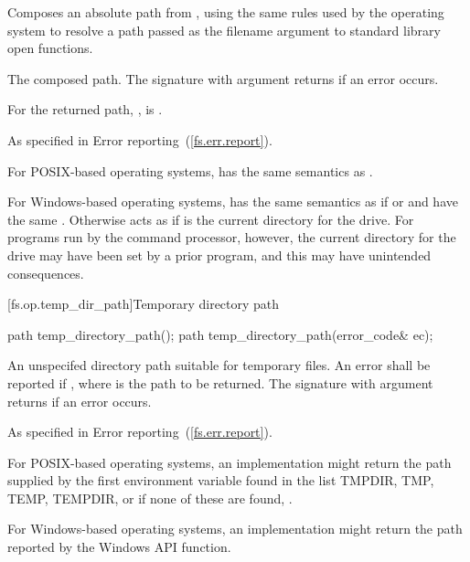 \begin{itemdescr}
\pnum
\effects Composes an absolute path from , using the
  same rules used by the operating system to resolve a path passed as the
  filename argument to standard library open functions.

\pnum
\returns The composed path. The signature with argument 
  returns  if an error occurs.

\pnum
\postconditions For the returned path, ,  is .

\pnum
\throws As specified in Error reporting~(\ref{fs.err.report}).

\pnum
\begin{example} For POSIX-based operating systems, 
  has the same semantics as .

\pnum
For Windows-based operating systems,  has the
  same semantics as  if
   or
   and  have the same .
  Otherwise  acts as if  is
  the current directory for the  drive.
  For programs run by the command processor, however, the current directory
  for the  drive may have been set by a prior program,
  and this may have unintended consequences.
\end{example}

\end{itemdescr}

[fs.op.temp_dir_path]{Temporary directory path}

%
\begin{itemdecl}
path temp_directory_path();
path temp_directory_path(error_code& ec);
\end{itemdecl}

\begin{itemdescr}
\pnum
\returns An unspecifed directory path suitable for temporary files. An error shall be reported if
, where  is the path to be returned.
  The signature with argument  returns  if an
  error occurs.

\pnum
\throws As specified in Error reporting~(\ref{fs.err.report}).

\pnum
\begin{example} For POSIX-based operating systems, an implementation might
  return the path
  supplied by the first environment variable found in the list TMPDIR, TMP, TEMP, TEMPDIR,
  or if none of these are found, .

\pnum
For Windows-based operating systems, an implementation might return the path
  reported by the Windows  API function.
\end{example}
\end{itemdescr}

